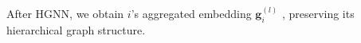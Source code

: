 After HGNN, we obtain $ i $'s aggregated embedding $ \textbf{g}_i^{(l)}$ , preserving its hierarchical graph structure.

